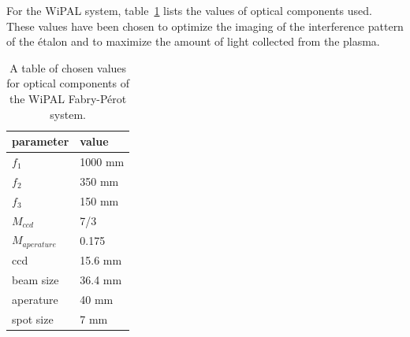 \documentclass{article}
\begin{document}
For the WiPAL system, table~\ref{tab:system} lists the values of optical components used. These values have been chosen to optimize the imaging of the interference pattern of the \'{e}talon and to maximize the amount of light collected from the plasma. 
\begin{table}
\begin{center}
\begin{tabular}{l | l }
parameter & value \\\hline
$f_{1}$ & 1000 mm\\
$f_{2}$ & 350 mm\\
$f_{3}$ & 150 mm\\
$M_{ccd}$ & 7/3 \\
$M_{aperature}$ & 0.175\\
ccd & 15.6 mm\\
beam size & 36.4 mm\\
aperature & 40 mm\\
spot size & 7 mm
\end{tabular}
\caption{A table of chosen values for optical components of the WiPAL Fabry-P\'{e}rot system.}
\label{tab:system}
\end{center}
\end{table}

\end{document}

